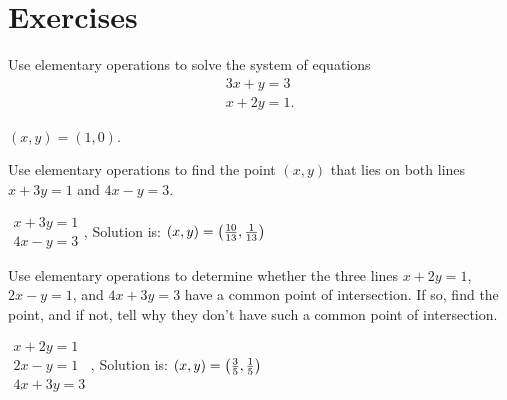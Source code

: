 \section*{Exercises}

\begin{ex}
  Use elementary operations to solve the system of equations
  \begin{equation*}
    \begin{array}{c}
      3x+y=3 \\
      x+2y=1.
    \end{array}
  \end{equation*}

  \begin{sol}
    $(x,y) = (1,0)$.
  \end{sol}
\end{ex}

\begin{ex}
  Use elementary operations to find the point $(x,y)$
  that lies on both lines $x+3y=1$ and $4x-y=3$.
  \begin{sol}
    $
    \begin{array}{c}
      x+3y=1 \\
      4x-y=3
    \end{array}
    $, Solution is: $(x,y) = \left(\frac{10}{13},\frac{1}{13}\right)$
  \end{sol}
\end{ex}

\begin{ex}
  Use elementary operations to determine whether the three lines
  $x+2y=1$, $2x-y=1$, and $4x+3y=3$ have a common point of intersection.
  If so, find the point, and if not, tell why they don't have such a
  common point of intersection.
  \begin{sol}
    $
    \begin{array}{c}
      x+2y=1 \\
      2x-y=1 \\
      4x+3y=3
    \end{array}
    $, Solution is: $(x,y) = \left(\frac{3}{5},\frac{1}{5}\right)$
  \end{sol}
\end{ex}

